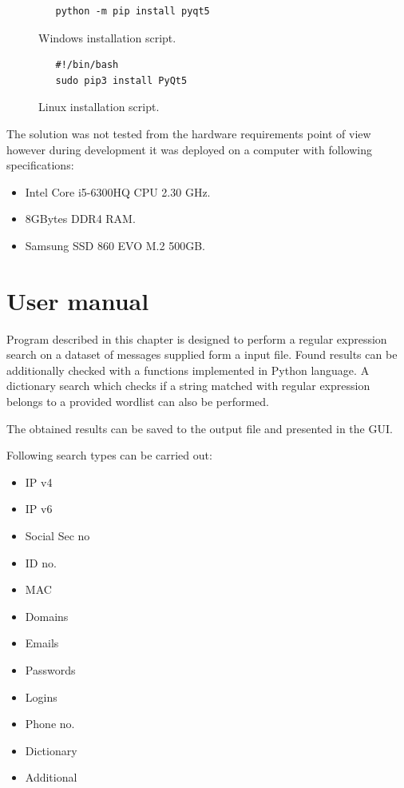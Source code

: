 \documentclass[a4paper,twoside,12pt]{book}
\begin{document}
\begin{figure}
   \centering
   \begin{lstlisting}
   python -m pip install pyqt5
   \end{lstlisting}
   \caption{Windows installation script.}
   \label{fig:windowsScript}
\end{figure}

\begin{figure}
   \centering
   \begin{lstlisting}
   #!/bin/bash
   sudo pip3 install PyQt5
   \end{lstlisting}
   \caption{Linux installation script.}
   \label{fig:linuxScript}
\end{figure}

The solution was not tested from the hardware requirements point of view however 
during development it was deployed on a computer with following specifications:

\begin{itemize}
   \item Intel Core i5-6300HQ CPU 2.30 GHz.
   \item 8GBytes DDR4 RAM.
   \item Samsung SSD 860 EVO M.2 500GB.
\end{itemize}


\section{User manual}

Program described in this chapter is designed to perform a regular expression search on a dataset of messages supplied form a input file. Found results can 
be additionally checked with a functions implemented in Python language. A dictionary search which checks if a string matched with regular expression belongs to a provided wordlist
can also be performed.

The obtained results can be saved to the output file and presented in the GUI.

Following search types can be carried out:

\begin{itemize}
   \item IP v4
   \item IP v6
   \item Social Sec no
   \item ID no.
   \item MAC
   \item Domains
   \item Emails
   \item Passwords
   \item Logins
   \item Phone no.
   \item Dictionary
   \item Additional
\end{itemize}
\end{document}
